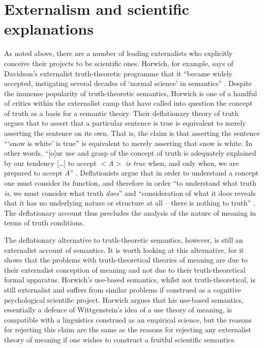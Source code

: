 \section{Externalism and scientific explanations}
As noted above, there are a number of leading externalists who explicitly conceive their projects to be scientific ones. Horwich, for example, says of Davidson’s externalist truth-theoretic programme that it “became widely accepted, instigating several decades of ‘normal science’ in semantics” \citep[371]{Horwich2001}. Despite the immense popularity of truth-theoretic semantics, Horwich is one of a handful of critics within the externalist camp that have called into question the concept of truth as a basis for a semantic theory. Their deflationary theory of truth argues that to assert that a particular sentence is true is equivalent to merely asserting the sentence on its own. That is, the claim is that asserting the sentence “‘snow is white’ is true” is equivalent to merely asserting that snow is white. In other words, “[o]ur use and grasp of the concept of truth is adequately explained by our tendency […] to accept $<$\textit{A}$>$ \textit{is true} when, and only when, we are prepared to accept \textit{A}” \citep[12, emphasis in original]{Armour-GarbBeall2005}. Deflationists argue that in order to understand a concept one must consider its function, and therefore in order “to understand what truth \textit{is}, we must consider what truth \textit{does}” and “consideration of what it does reveals that it has no underlying nature or structure at all – there is nothing to truth” \citep[17, emphasis in original]{Armour-GarbBeall2005}. The deflationary account thus precludes the analysis of the nature of meaning in terms of truth conditions.

The deflationary alternative to truth-theoretic semantics, however, is still an externalist account of semantics. It is worth looking at this alternative, for it shows that the problems with truth-theoretical theories of meaning are due to their externalist conception of meaning and not due to their truth-theoretical formal apparatus. Horwich’s use-based semantics, whilst not truth-theoretical, is still externalist and suffers from similar problems if construed as a cognitive psychological scientific project. Horwich argues that his use-based semantics, essentially a defence of Wittgenstein’s idea of a use theory of meaning, is compatible with a linguistics construed as an empirical science, but the reasons for rejecting this claim are the same as the reasons for rejecting any externalist theory of meaning if one wishes to construct a fruitful scientific semantics.


